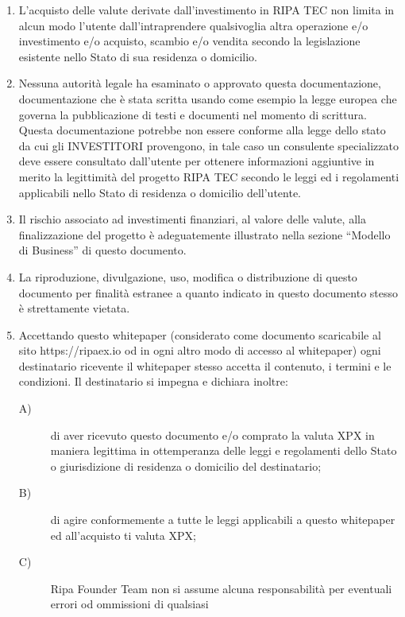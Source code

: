 \begin{scriptsize}
{\begin{enumerate}
			commerciale e/o finanziario in merito ai prodotti e servizi ivi descritti in RIPA TEC nè in relazione ad investimenti
			futuri nel progetto RipaEx Le persone che anno accesso al whitepaper dovranno avvalersi di un consulente specializzato
			prima di compiere qualunque scelta.
			\item L'acquisto delle valute derivate dall'investimento in RIPA TEC non limita in alcun modo l'utente 
			dall'intraprendere qualsivoglia altra operazione e/o investimento e/o acquisto, scambio e/o vendita secondo la 
			legislazione esistente nello Stato di sua residenza o domicilio.
			\item Nessuna autorità legale ha esaminato o approvato questa documentazione, documentazione che è stata scritta
			usando come esempio la legge europea che governa la pubblicazione di testi e documenti nel momento di scrittura.
			Questa documentazione potrebbe non essere conforme alla legge dello stato da cui gli INVESTITORI provengono,
			in tale caso un consulente specializzato deve essere consultato dall'utente per ottenere informazioni aggiuntive 
			in merito la legittimità del progetto RIPA TEC secondo le leggi ed i regolamenti applicabili nello Stato di residenza
			o domicilio dell'utente.
			\item  Il rischio associato ad investimenti finanziari, al valore delle valute, alla finalizzazione del progetto
			è adeguatemente illustrato nella sezione ``Modello di Business'' di questo documento.
			\item La riproduzione, divulgazione, uso, modifica o distribuzione di questo documento per finalità estranee a quanto
			indicato in questo documento stesso è strettamente vietata.
			\item Accettando questo whitepaper (considerato come documento scaricabile al sito https://ripaex.io od in
			ogni altro modo di accesso al whitepaper) ogni destinatario ricevente il whitepaper stesso accetta il contenuto, i termini
			e le condizioni.
			Il destinatario si impegna e dichiara inoltre:
			\begin{description}
				\item[A)] di aver ricevuto questo documento e/o comprato la valuta XPX in maniera legittima in ottemperanza delle 
				leggi e regolamenti dello Stato o giurisdizione di residenza o domicilio del destinatario; 
				\item[B)] di agire conformemente a tutte le leggi applicabili a questo whitepaper ed all'acquisto ti valuta XPX; 
				\item[C)] Ripa Founder Team non si assume alcuna responsabilità per eventuali errori od ommissioni di qualsiasi

\end{description}
\end{enumerate}}
\end{scriptsize}
